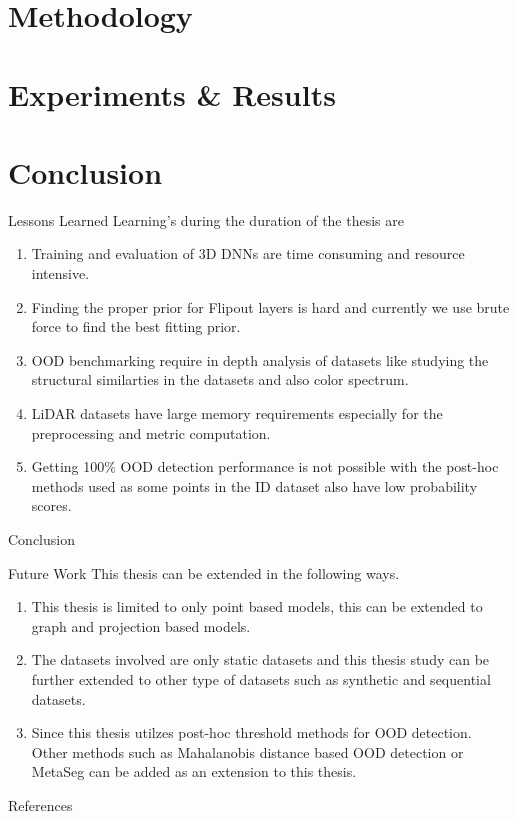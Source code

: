 \documentclass[aspectratio=169]{beamer}
\begin{document}
\section{Methodology}
\section{Experiments \& Results}
\section{Conclusion}
\begin{frame}{Lessons Learned}
    Learning's during the duration of the thesis are
    \begin{enumerate}
        \item Training and evaluation of 3D DNNs are time consuming and resource intensive.
        \item Finding the proper prior for Flipout layers is hard and currently we use brute force to find the best fitting prior.
        \item OOD benchmarking require in depth analysis of datasets like studying the structural similarties in the datasets and also color spectrum.
        \item LiDAR datasets have large memory requirements especially for the preprocessing and metric computation.
        \item Getting 100\% OOD detection performance is not possible with the post-hoc methods used as some points in the ID dataset also have low probability scores.
    \end{enumerate}
\end{frame}
\begin{frame}{Conclusion}
    
\end{frame}
\begin{frame}{Future Work}
    This thesis can be extended in the following ways.
    \begin{enumerate}
        \item This thesis is limited to only point based models, this can be extended to graph and projection based models.
        \item The datasets involved are only static datasets and this thesis study can be further extended to other type of datasets such as synthetic and sequential datasets.
        \item Since this thesis utilzes post-hoc threshold methods for OOD detection. Other methods such as Mahalanobis distance based OOD detection \cite{lee2018simple_mahalanobis} or MetaSeg \cite{MetaSeg} can be added as an extension to this thesis.
    \end{enumerate}
\end{frame}
\begin{frame}{References}
    
    

\end{frame}
\end{document}
